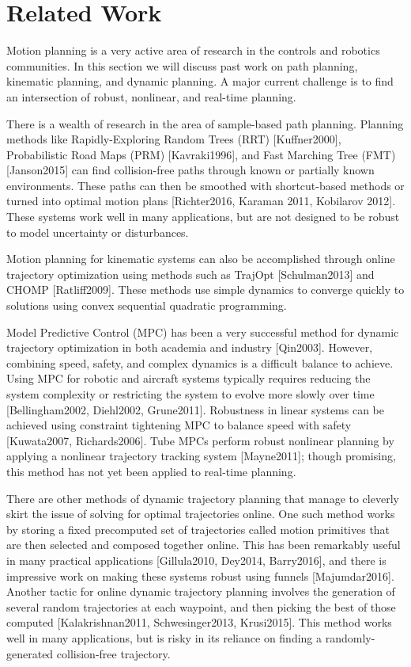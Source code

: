 \section{Related Work \label{sec:relatedwork}}
Motion planning is a very active area of research in the controls and robotics communities.  In this section we will discuss past work on path planning, kinematic planning, and dynamic planning.  A major current challenge is to find an intersection of robust, nonlinear, and real-time planning. 

There is a wealth of research in the area of sample-based path planning.  Planning methods like Rapidly-Exploring Random Trees (RRT) [Kuffner2000], Probabilistic Road Maps (PRM) [Kavraki1996], and Fast Marching Tree (FMT) [Janson2015] can find collision-free paths through known or partially known environments. These paths can then be smoothed with shortcut-based methods or turned into optimal motion plans [Richter2016, Karaman 2011, Kobilarov 2012].  These systems work well in many applications, but are not designed to be robust to model uncertainty or disturbances.

Motion planning for kinematic systems can also be accomplished through online trajectory optimization using methods such as TrajOpt [Schulman2013] and CHOMP [Ratliff2009].  These methods use simple dynamics to converge quickly to solutions using convex sequential quadratic programming.

Model Predictive Control (MPC) has been a very successful method for dynamic trajectory optimization in both academia and industry [Qin2003].  However, combining speed, safety, and complex dynamics is a difficult balance to achieve.  Using MPC for robotic and aircraft systems typically requires reducing the system complexity or restricting the system to evolve more slowly over time [Bellingham2002, Diehl2002, Grune2011].  Robustness in linear systems can be achieved using constraint tightening MPC to balance speed with safety [Kuwata2007, Richards2006]. Tube MPCs perform robust nonlinear planning by applying a nonlinear trajectory tracking system [Mayne2011]; though promising, this method has not yet been applied to real-time planning.

There are other methods of dynamic trajectory planning that manage to cleverly skirt the issue of solving for optimal trajectories online.  One such method works by storing a fixed precomputed set of trajectories called motion primitives that are then selected and composed together online.  This has been remarkably useful in many practical applications [Gillula2010, Dey2014, Barry2016], and there is impressive work on making these systems robust using funnels [Majumdar2016].  Another tactic for online dynamic trajectory planning involves the generation of several random trajectories at each waypoint, and then picking the best of those computed [Kalakrishnan2011, Schwesinger2013, Krusi2015].  This method works well in many applications, but is risky in its reliance on finding a randomly-generated collision-free trajectory.  


